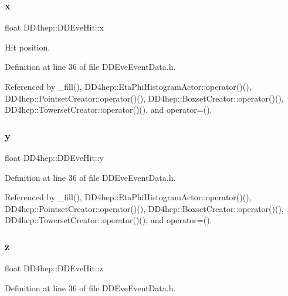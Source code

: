 \subsubsection{\texorpdfstring{x}{x}}
{\footnotesize\ttfamily float D\+D4hep\+::\+D\+D\+Eve\+Hit\+::x}



Hit position. 



Definition at line 36 of file D\+D\+Eve\+Event\+Data.\+h.



Referenced by \+\_\+fill(), D\+D4hep\+::\+Eta\+Phi\+Histogram\+Actor\+::operator()(), D\+D4hep\+::\+Pointset\+Creator\+::operator()(), D\+D4hep\+::\+Boxset\+Creator\+::operator()(), D\+D4hep\+::\+Towerset\+Creator\+::operator()(), and operator=().

\hypertarget{class_d_d4hep_1_1_d_d_eve_hit_a4eb2c75de026adb1bc8d73267c8a3fb4}{}\label{class_d_d4hep_1_1_d_d_eve_hit_a4eb2c75de026adb1bc8d73267c8a3fb4} 
\subsubsection{\texorpdfstring{y}{y}}
{\footnotesize\ttfamily float D\+D4hep\+::\+D\+D\+Eve\+Hit\+::y}



Definition at line 36 of file D\+D\+Eve\+Event\+Data.\+h.



Referenced by \+\_\+fill(), D\+D4hep\+::\+Eta\+Phi\+Histogram\+Actor\+::operator()(), D\+D4hep\+::\+Pointset\+Creator\+::operator()(), D\+D4hep\+::\+Boxset\+Creator\+::operator()(), D\+D4hep\+::\+Towerset\+Creator\+::operator()(), and operator=().

\hypertarget{class_d_d4hep_1_1_d_d_eve_hit_affe739f66c56ced8a7d79b5c736f3b21}{}\label{class_d_d4hep_1_1_d_d_eve_hit_affe739f66c56ced8a7d79b5c736f3b21} 
\subsubsection{\texorpdfstring{z}{z}}
{\footnotesize\ttfamily float D\+D4hep\+::\+D\+D\+Eve\+Hit\+::z}



Definition at line 36 of file D\+D\+Eve\+Event\+Data.\+h.



